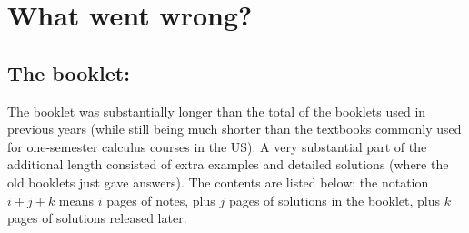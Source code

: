 \documentclass{amsart}
\begin{document}
\section*{What went wrong?}

\subsection*{The booklet:}

The booklet was substantially longer than the total of the booklets
used in previous years (while still being much shorter than the
textbooks commonly used for one-semester calculus courses in the US).
A very substantial part of the additional length consisted of extra
examples and detailed solutions (where the old booklets just gave
answers).  The contents are listed below; the notation $i+j+k$ means
$i$ pages of notes, plus $j$ pages of solutions in the booklet, plus
$k$ pages of solutions released later.  
\end{document}
